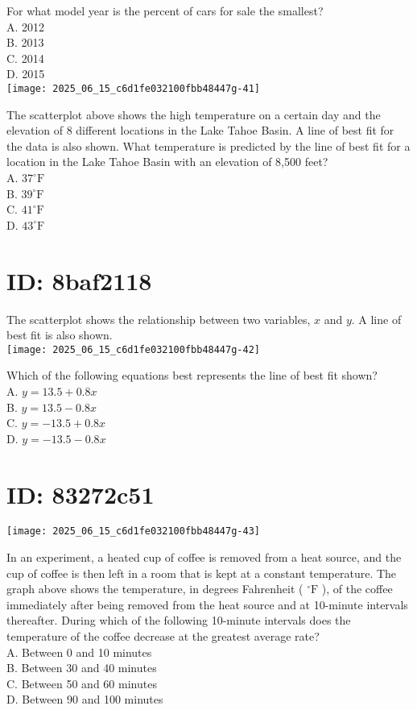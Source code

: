 For what model year is the percent of cars for sale the smallest?\\
A. 2012\\
B. 2013\\
C. 2014\\
D. 2015\\
\texttt{[image: 2025\_06\_15\_c6d1fe032100fbb48447g-41]}

The scatterplot above shows the high temperature on a certain day and the elevation of 8 different locations in the Lake Tahoe Basin. A line of best fit for the data is also shown. What temperature is predicted by the line of best fit for a location in the Lake Tahoe Basin with an elevation of 8,500 feet?\\
A. $37^{\circ} \mathrm{F}$\\
B. $39^{\circ} \mathrm{F}$\\
C. $41^{\circ} \mathrm{F}$\\
D. $43^{\circ} \mathrm{F}$

\section*{ID: 8baf2118}
The scatterplot shows the relationship between two variables, $x$ and $y$. A line of best fit is also shown.\\
\texttt{[image: 2025\_06\_15\_c6d1fe032100fbb48447g-42]}

Which of the following equations best represents the line of best fit shown?\\
A. $y=13.5+0.8 x$\\
B. $y=13.5-0.8 x$\\
C. $y=-13.5+0.8 x$\\
D. $y=-13.5-0.8 x$

\section*{ID: 83272c51}
\begin{center}
\texttt{[image: 2025\_06\_15\_c6d1fe032100fbb48447g-43]}
\end{center}

In an experiment, a heated cup of coffee is removed from a heat source, and the cup of coffee is then left in a room that is kept at a constant temperature. The graph above shows the temperature, in degrees Fahrenheit ( ${ }^{\circ} \mathrm{F}$ ), of the coffee immediately after being removed from the heat source and at 10-minute intervals thereafter. During which of the following 10-minute intervals does the temperature of the coffee decrease at the greatest average rate?\\
A. Between 0 and 10 minutes\\
B. Between 30 and 40 minutes\\
C. Between 50 and 60 minutes\\
D. Between 90 and 100 minutes

